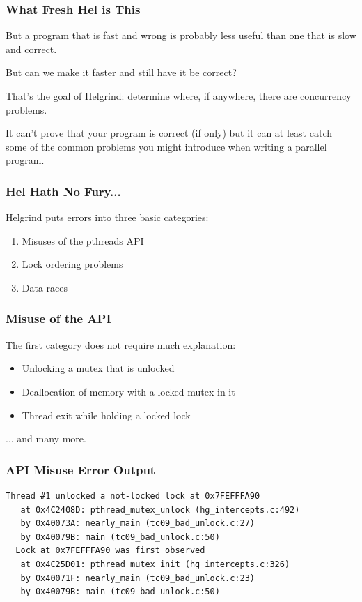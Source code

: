 \begin{frame}
\frametitle{What Fresh Hel is This}

But a program that is fast and wrong is probably less useful than one that is slow and correct. 

But can we make it faster and still have it be correct? 

That's the goal of Helgrind: determine where, if anywhere, there are concurrency problems. 

It can't prove that your program is correct (if only) but it can at least catch some of the common problems you might introduce when writing a parallel program.

\end{frame}

\begin{frame}
\frametitle{Hel Hath No Fury...}

Helgrind puts errors into three basic categories:

\begin{enumerate}
	\item Misuses of the pthreads API
	\item Lock ordering problems
	\item Data races
\end{enumerate}


\end{frame}

\begin{frame}
\frametitle{Misuse of the API}

The first category does not require much explanation:


\begin{itemize}
	\item Unlocking a mutex that is unlocked
	\item Deallocation of memory with a locked mutex in it
	\item Thread exit while holding a locked lock
\end{itemize}
... and many more.


\end{frame}

\begin{frame}[fragile]
\frametitle{API Misuse Error Output}


\begin{verbatim}
Thread #1 unlocked a not-locked lock at 0x7FEFFFA90
   at 0x4C2408D: pthread_mutex_unlock (hg_intercepts.c:492)
   by 0x40073A: nearly_main (tc09_bad_unlock.c:27)
   by 0x40079B: main (tc09_bad_unlock.c:50)
  Lock at 0x7FEFFFA90 was first observed
   at 0x4C25D01: pthread_mutex_init (hg_intercepts.c:326)
   by 0x40071F: nearly_main (tc09_bad_unlock.c:23)
   by 0x40079B: main (tc09_bad_unlock.c:50)
\end{verbatim}

\end{frame}

